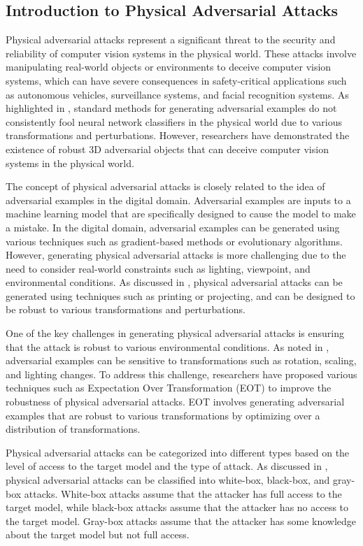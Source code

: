 \documentclass[11pt,a4paper]{article}
\begin{document}
\subsection{Introduction to Physical Adversarial Attacks}


Physical adversarial attacks represent a significant threat to the security and reliability of computer vision systems in the physical world. These attacks involve manipulating real-world objects or environments to deceive computer vision systems, which can have severe consequences in safety-critical applications such as autonomous vehicles, surveillance systems, and facial recognition systems. As highlighted in \cite{arxiv:1707.07397}, standard methods for generating adversarial examples do not consistently fool neural network classifiers in the physical world due to various transformations and perturbations. However, researchers have demonstrated the existence of robust 3D adversarial objects that can deceive computer vision systems in the physical world.

The concept of physical adversarial attacks is closely related to the idea of adversarial examples in the digital domain. Adversarial examples are inputs to a machine learning model that are specifically designed to cause the model to make a mistake. In the digital domain, adversarial examples can be generated using various techniques such as gradient-based methods or evolutionary algorithms. However, generating physical adversarial attacks is more challenging due to the need to consider real-world constraints such as lighting, viewpoint, and environmental conditions. As discussed in \cite{arxiv:1707.08945}, physical adversarial attacks can be generated using techniques such as printing or projecting, and can be designed to be robust to various transformations and perturbations.

One of the key challenges in generating physical adversarial attacks is ensuring that the attack is robust to various environmental conditions. As noted in \cite{doi:10.24963/ijcai.2021/694}, adversarial examples can be sensitive to transformations such as rotation, scaling, and lighting changes. To address this challenge, researchers have proposed various techniques such as Expectation Over Transformation (EOT) to improve the robustness of physical adversarial attacks. EOT involves generating adversarial examples that are robust to various transformations by optimizing over a distribution of transformations.

Physical adversarial attacks can be categorized into different types based on the level of access to the target model and the type of attack. As discussed in \cite{doi:10.1109/access.2018.2807385}, physical adversarial attacks can be classified into white-box, black-box, and gray-box attacks. White-box attacks assume that the attacker has full access to the target model, while black-box attacks assume that the attacker has no access to the target model. Gray-box attacks assume that the attacker has some knowledge about the target model but not full access.
\end{document}
